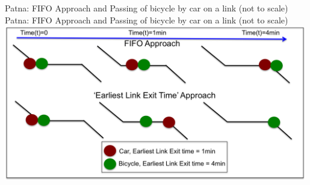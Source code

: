 \createfigure%
{Patna: FIFO Approach and Passing of bicycle by car on a link (not to scale)}%
{Patna: FIFO Approach and Passing of bicycle by car on a link (not to scale)}%
{\label{fig:patna1}}%
{\includegraphics[width=0.99\textwidth, angle=0]{using/figures/FIFOandPassing}}%
{}

